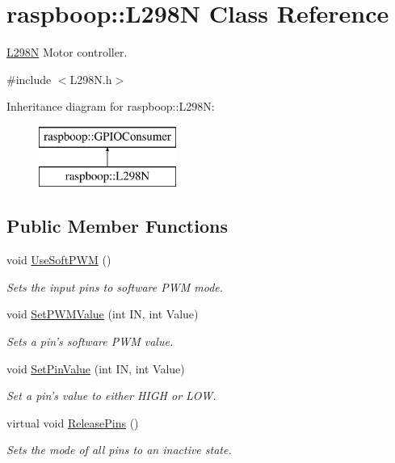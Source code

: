 \hypertarget{classraspboop_1_1L298N}{\section{raspboop\-:\-:L298\-N Class Reference}
\label{classraspboop_1_1L298N}
}


\hyperlink{classraspboop_1_1L298N}{L298\-N} Motor controller.  




{\ttfamily \#include $<$L298\-N.\-h$>$}

Inheritance diagram for raspboop\-:\-:L298\-N\-:\begin{figure}[H]
\begin{center}
\leavevmode
\includegraphics[height=2.000000cm]{classraspboop_1_1L298N}
\end{center}
\end{figure}
\subsection*{Public Member Functions}
\begin{DoxyCompactItemize}
\item 
void \hyperlink{classraspboop_1_1L298N_a02313609416e301b2d9591ec1032c7e6}{Use\-Soft\-P\-W\-M} ()
\begin{DoxyCompactList}\small\item\em Sets the input pins to software P\-W\-M mode. \end{DoxyCompactList}\item 
void \hyperlink{classraspboop_1_1L298N_a0db4bc15c28818ed54e80f65f9f25d72}{Set\-P\-W\-M\-Value} (int I\-N, int Value)
\begin{DoxyCompactList}\small\item\em Sets a pin's software P\-W\-M value. \end{DoxyCompactList}\item 
void \hyperlink{classraspboop_1_1L298N_a18137a4b8e3ba274cf6bf72e896f7563}{Set\-Pin\-Value} (int I\-N, int Value)
\begin{DoxyCompactList}\small\item\em Set a pin's value to either H\-I\-G\-H or L\-O\-W. \end{DoxyCompactList}\item 
virtual void \hyperlink{classraspboop_1_1L298N_a5ed5847ed8db5835fbf5e4f960a374e9}{Release\-Pins} ()
\begin{DoxyCompactList}\small\item\em Sets the mode of all pins to an inactive state. \end{DoxyCompactList}\end{DoxyCompactItemize}
